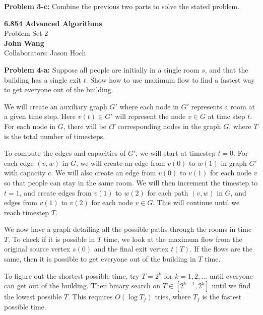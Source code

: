 \documentclass[psamsfonts]{amsart}
\newenvironment{sol}{\vspace{0.25cm}{\large \bfseries Solution:}}{\qedsymbol}
\newenvironment{prob}[1]{\begin{framed}{\large \bfseries Problem #1:}}{\end{framed}}
\newcommand{\makenewtitle}{
    \begin{center}
    {\huge \bfseries 6.854 Advanced Algorithms} \\
    Problem Set 2\\
    \vspace{0.25cm}
    {\bfseries John Wang} \\
    Collaborators: Jason Hoch
    \end{center}
    \vspace{0.5cm}
}
\begin{document}
\begin{prob}{3-c}
Combine the previous two parts to solve the stated problem.
\end{prob}
\begin{sol}
\end{sol}

\newpage
\makenewtitle

\begin{prob}{4-a}
Suppose all people are initially in a single room $s$, and that the building has a single exit $t$. Show how to use maximum flow to find a fastest way to get everyone out of the building.
\end{prob}
\begin{sol}
We will create an auxiliary graph $G'$ where each node in $G'$ represents a room at a given time step. Here $v(t) \in G'$ will represent the node $v \in G$ at time step $t$. For each node in $G$, there will be $tT$ corresponding nodes in the graph $G$, where $T$ is the total number of timesteps.

To compute the edges and capacities of $G'$, we will start at timestep $t=0$. For each edge $(v,w)$ in $G$, we will create an edge from $v(0)$ to $w(1)$ in graph $G'$ with capacity $c$. We will also create an edge from $v(0)$ to $v(1)$ for each node $v$ so that people can stay in the same room. We will then increment the timestep to $t=1$, and create edges from $v(1)$ to $w(2)$ for each path $(v,w)$ in $G$, and edges from $v(1)$ to $v(2)$ for each node $v \in G$. This will continue until we reach timestep $T$. 

We now have a graph detailing all the possible paths through the rooms in time $T$. To check if it is possible in $T$ time, we look at the maximum flow from the original source vertex $s(0)$ and the final exit vertex $t(T)$. If the flows are the same, then it is possible to get everyone out of the building in $T$ time. 

To figure out the shortest possible time, try $T=2^{k}$ for $k=1,2,\ldots$ until everyone can get out of the building. Then binary search on $T \in [2^{k-1}, 2^{k}]$ until we find the lowest possible $T$. This requires $O(\log T_{f})$ tries, where $T_f$ is the fastest possible time.
\end{sol}
\end{document}
